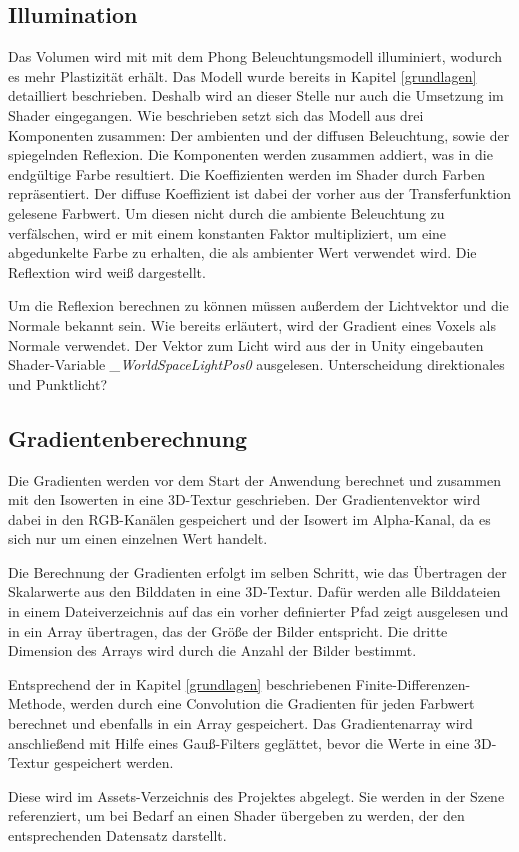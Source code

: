 \subsection{Illumination}
\label{illumination}

Das Volumen wird mit mit dem Phong Beleuchtungsmodell illuminiert, wodurch es mehr Plastizität erhält. Das Modell wurde bereits in Kapitel \ref{grundlagen} detailliert beschrieben. Deshalb wird an dieser Stelle nur auch die Umsetzung im Shader eingegangen.
Wie beschrieben setzt sich das Modell aus drei Komponenten zusammen: Der ambienten und der diffusen Beleuchtung, sowie der spiegelnden Reflexion. Die Komponenten werden zusammen addiert, was in die endgültige Farbe resultiert. 
Die Koeffizienten werden im Shader durch Farben repräsentiert. Der diffuse Koeffizient ist dabei der vorher aus der Transferfunktion gelesene Farbwert. Um diesen nicht durch die ambiente Beleuchtung zu verfälschen, wird er mit einem konstanten Faktor multipliziert, um eine abgedunkelte Farbe zu erhalten, die als ambienter Wert verwendet wird. Die Reflextion wird weiß dargestellt.

Um die Reflexion berechnen zu können müssen außerdem der Lichtvektor und die Normale bekannt sein.
Wie bereits erläutert, wird der Gradient eines Voxels als Normale verwendet. 
Der Vektor zum Licht wird aus der in Unity eingebauten Shader-Variable \textit{\_WorldSpaceLightPos0} ausgelesen.
Unterscheidung direktionales und Punktlicht?

\subsection{Gradientenberechnung}
\label{gradienten}


Die Gradienten werden vor dem Start der Anwendung berechnet und zusammen mit den Isowerten in eine 3D-Textur geschrieben. Der Gradientenvektor wird dabei in den RGB-Kanälen gespeichert und der Isowert im Alpha-Kanal, da es sich nur um einen einzelnen Wert handelt. 

Die Berechnung der Gradienten erfolgt im selben Schritt, wie das Übertragen der Skalarwerte aus den Bilddaten in eine 3D-Textur.
Dafür werden alle Bilddateien in einem Dateiverzeichnis auf das ein vorher definierter Pfad zeigt ausgelesen und in ein Array übertragen, das der Größe der Bilder entspricht. Die dritte Dimension des Arrays wird durch die Anzahl der Bilder bestimmt. 

Entsprechend der in Kapitel \ref{grundlagen} beschriebenen Finite-Differenzen-Methode, werden durch eine Convolution die Gradienten für jeden Farbwert berechnet und ebenfalls in ein Array gespeichert.
Das Gradientenarray wird anschließend mit Hilfe eines Gauß-Filters geglättet, bevor die Werte in eine 3D-Textur gespeichert werden. 

Diese wird im Assets-Verzeichnis des Projektes abgelegt. Sie werden in der Szene referenziert, um bei Bedarf an einen Shader übergeben zu werden, der den entsprechenden Datensatz darstellt. 